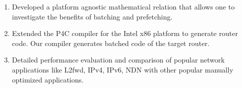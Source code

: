 \begin{enumerate}
\item Developed a platform agnostic mathematical relation that allows one to investigate the benefits of batching and prefetching.
\item Extended the P4C compiler for the Intel x86 platform to generate router code. Our compiler generates batched code of the target router.
\item Detailed performance evaluation and comparison of popular network applications like L2fwd, IPv4, IPv6, NDN with other popular manually optimized applications.
\end{enumerate}